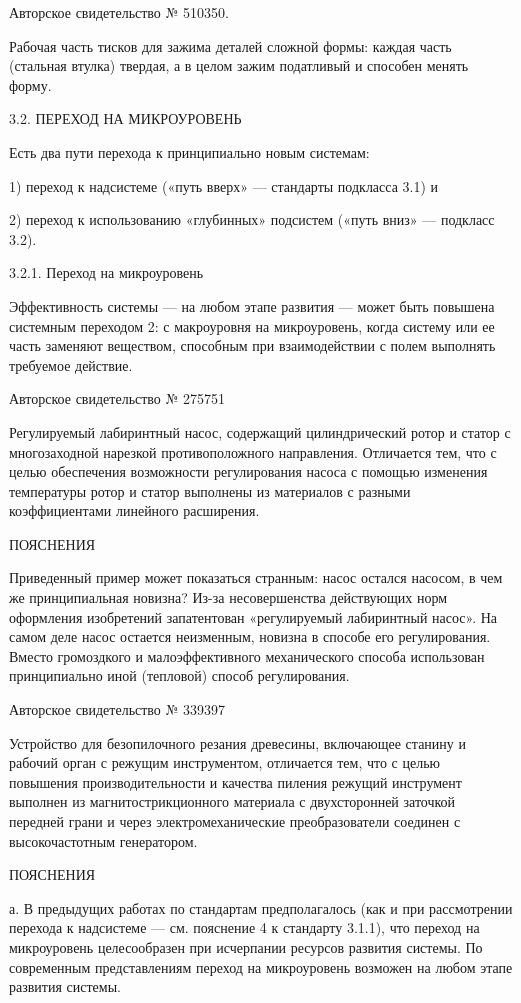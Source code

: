 Авторское свидетельство № 510350.

Рабочая часть  тисков для зажима  деталей сложной формы:  каждая часть
(стальная  втулка) твердая,  а  в целом  зажим  податливый и  способен
менять форму.


3.2. ПЕРЕХОД НА МИКРОУРОВЕНЬ

Есть два пути перехода к принципиально новым системам:

1) переход к надсистеме («путь вверх» — стандарты подкласса 3.1) и

2)  переход  к  использованию  «глубинных» подсистем  («путь  вниз»  —
подкласс 3.2).

3.2.1. Переход на микроуровень

Эффективность системы — на любом  этапе развития — может быть повышена
системным переходом  2: с  макроуровня на микроуровень,  когда систему
или ее часть заменяют веществом,  способным при взаимодействии с полем
выполнять требуемое действие.


Авторское свидетельство № 275751

Регулируемый  лабиринтный   насос,  содержащий   цилиндрический  ротор
и  статор  с   многозаходной  нарезкой  противоположного  направления.
Отличается  тем, что  с  целью  обеспечения возможности  регулирования
насоса с  помощью изменения  температуры ротор  и статор  выполнены из
материалов с разными коэффициентами линейного расширения.


ПОЯСНЕНИЯ

Приведенный пример  может показаться странным: насос  остался насосом,
в  чем же  принципиальная  новизна?  Из-за несовершенства  действующих
норм  оформления  изобретений запатентован  «регулируемый  лабиринтный
насос».   На  самом   деле  насос   остается  неизменным,   новизна  в
способе  его  регулирования.  Вместо  громоздкого  и  малоэффективного
механического способа использован принципиально иной (тепловой) способ
регулирования.


Авторское свидетельство № 339397

Устройство для  безопилочного резания древесины, включающее  станину и
рабочий  орган с  режущим инструментом,  отличается тем,  что с  целью
повышения  производительности и  качества  пиления режущий  инструмент
выполнен  из магнитострикционного  материала с  двухсторонней заточкой
передней грани и через  электромеханические преобразователи соединен с
высокочастотным генератором.


ПОЯСНЕНИЯ

а.  В  предыдущих работах  по  стандартам  предполагалось (как  и  при
рассмотрении  перехода к  надсистеме  — см.  пояснение  4 к  стандарту
3.1.1),  что  переход  на микроуровень  целесообразен  при  исчерпании
ресурсов развития  системы. По  современным представлениям  переход на
микроуровень возможен на любом этапе развития системы.

